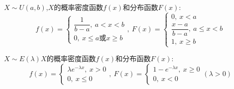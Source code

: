 \begin{definition}[常见连续型随机变量分布]
	
	$X\sim U(a,b)$,$X$的概率密度函数$f(x)$和分布函数$F(x)$: 
	$$f(x)=\left\lbrace 
	\begin{array}{l}
		\dfrac{1}{b-a},\ a<x<b\\
		0,\ x\leq a\text{或}x\geq b
	\end{array}
	\right. ,\ F(x)=\left\lbrace 
	\begin{array}{l}
		0,\ x<a\\
		\dfrac{x-a}{b-a},\ a\leq x<b \\
		1,\ x\geq b
	\end{array}
	\right. $$
	\begin{figure}[H]
		\centering  %
	\end{figure}
	
	$X\sim E(\lambda)$$X$的概率密度函数$f(x)$和分布函数$F(x)$: 
	$$f(x)=\left\lbrace 
	\begin{array}{l}
		\lambda e^{-\lambda x},\ x>0\\
		0,\ x\leq 0
	\end{array}
	\right. ,\ F(x)=\left\lbrace 
	\begin{array}{l}
		1-e^{-\lambda x},\ x\geq 0\\
		0,\ x<0
	\end{array}
	\right. (\lambda>0)$$
	\begin{figure}[H]
		\centering  %
	\end{figure}
	

\end{definition}
